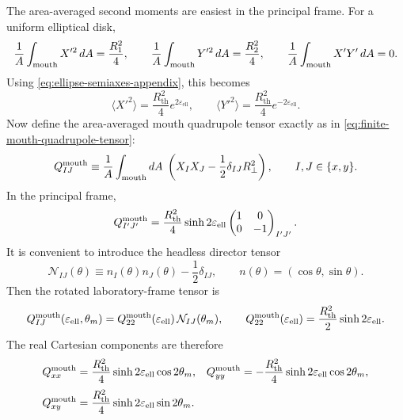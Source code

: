 \documentclass[11pt]{article}
\theoremstyle{plain}
\theoremstyle{definition}
\theoremstyle{remark}
\newcommand{\Rth}{R_{\mathrm{th}}}
\newcommand{\epsell}{\varepsilon_{\mathrm{ell}}}
\newcommand{\thmouth}{\theta_m}
\begin{document}
The area-averaged second moments are easiest in the principal frame. For a uniform elliptical disk,
\begin{equation}
\frac{1}{A}\int_{\rm mouth} X'^2\,dA = \frac{R_1^2}{4},
\qquad
\frac{1}{A}\int_{\rm mouth} Y'^2\,dA = \frac{R_2^2}{4},
\qquad
\frac{1}{A}\int_{\rm mouth} X'Y'\,dA = 0.
\label{eq:ellipse-second-moments-principal}
\end{equation}
Using \cref{eq:ellipse-semiaxes-appendix}, this becomes
\begin{equation}
\bigl\langle X'^2\bigr\rangle = \frac{\Rth^2}{4}e^{2\epsell},
\qquad
\bigl\langle Y'^2\bigr\rangle = \frac{\Rth^2}{4}e^{-2\epsell}.
\label{eq:ellipse-second-moments-principal-explicit}
\end{equation}
Now define the area-averaged mouth quadrupole tensor exactly as in \cref{eq:finite-mouth-quadrupole-tensor}:
\begin{equation}
Q_{IJ}^{\rm mouth}
\equiv
\frac1A\int_{\rm mouth}dA\;\left(X_IX_J-\frac12\delta_{IJ}R_\perp^2\right),
\qquad I,J\in\{x,y\}.
\label{eq:ellipse-mouth-quadrupole-def}
\end{equation}
In the principal frame,
\begin{equation}
Q_{I'J'}^{\rm mouth}
=
\frac{\Rth^2}{4}\sinh 2\epsell
\begin{pmatrix}
1 & 0 \\
0 & -1
\end{pmatrix}_{I'J'}.
\label{eq:ellipse-mouth-quadrupole-principal}
\end{equation}
It is convenient to introduce the headless director tensor
\begin{equation}
\mathcal N_{IJ}(\theta)
\equiv
n_I(\theta)n_J(\theta)-\frac12\delta_{IJ},
\qquad
n(\theta)=(\cos\theta,\sin\theta).
\label{eq:ellipse-director-tensor}
\end{equation}
Then the rotated laboratory-frame tensor is
\begin{equation}
Q_{IJ}^{\rm mouth}(\epsell,\thmouth)
=
Q_{22}^{\rm mouth}(\epsell)\,\mathcal N_{IJ}(\thmouth),
\qquad
Q_{22}^{\rm mouth}(\epsell)=\frac{\Rth^2}{2}\sinh 2\epsell.
\label{eq:ellipse-mouth-tensor-director}
\end{equation}
The real Cartesian components are therefore
\begin{align}
Q_{xx}^{\rm mouth}
&=
\frac{\Rth^2}{4}\sinh 2\epsell\cos 2\thmouth,
&
Q_{yy}^{\rm mouth}
&=
-\frac{\Rth^2}{4}\sinh 2\epsell\cos 2\thmouth,
\label{eq:ellipse-mouth-components-diag}
\\[0.5ex]
Q_{xy}^{\rm mouth}
&=
\frac{\Rth^2}{4}\sinh 2\epsell\sin 2\thmouth.
\label{eq:ellipse-mouth-components-offdiag}
\end{align}
\end{document}

